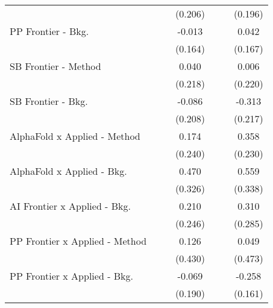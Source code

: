 \begin{tabular}{lcccccc}
                                  &               &               & (0.206)       &               &         & (0.196)\\   
   PP Frontier - Bkg.             &               &               & -0.013        &               &         & 0.042\\   
                                  &               &               & (0.164)       &               &         & (0.167)\\   
   SB Frontier - Method           &               &               & 0.040         &               &         & 0.006\\   
                                  &               &               & (0.218)       &               &         & (0.220)\\   
   SB Frontier - Bkg.             &               &               & -0.086        &               &         & -0.313\\   
                                  &               &               & (0.208)       &               &         & (0.217)\\   
   AlphaFold x Applied - Method   &               &               & 0.174         &               &         & 0.358\\   
                                  &               &               & (0.240)       &               &         & (0.230)\\   
   AlphaFold x Applied - Bkg.     &               &               & 0.470         &               &         & 0.559\\   
                                  &               &               & (0.326)       &               &         & (0.338)\\   
   AI Frontier x Applied - Bkg.   &               &               & 0.210         &               &         & 0.310\\   
                                  &               &               & (0.246)       &               &         & (0.285)\\   
   PP Frontier x Applied - Method &               &               & 0.126         &               &         & 0.049\\   
                                  &               &               & (0.430)       &               &         & (0.473)\\   
   PP Frontier x Applied - Bkg.   &               &               & -0.069        &               &         & -0.258\\   
                                  &               &               & (0.190)       &               &         & (0.161)\\   

\end{tabular}
